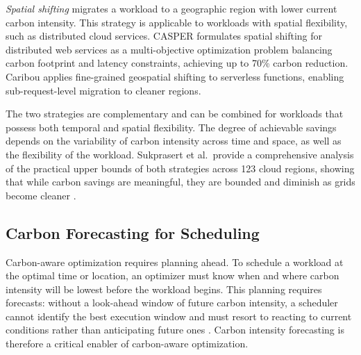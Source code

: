 \textit{Spatial shifting} migrates a workload to a geographic region with lower current carbon intensity.
This strategy is applicable to workloads with spatial flexibility, such as distributed cloud services.
CASPER \cite{souza_casper_2023} formulates spatial shifting for distributed web services as a multi-objective optimization problem balancing carbon footprint and latency constraints, achieving up to 70\% carbon reduction.
Caribou \cite{gsteiger_caribou_2024} applies fine-grained geospatial shifting to serverless functions, enabling sub-request-level migration to cleaner regions.

The two strategies are complementary and can be combined for workloads that possess both temporal and spatial flexibility.
The degree of achievable savings depends on the variability of carbon intensity across time and space, as well as the flexibility of the workload.
Sukprasert et al.\ provide a comprehensive analysis of the practical upper bounds of both strategies across 123 cloud regions, showing that while carbon savings are meaningful, they are bounded and diminish as grids become cleaner \cite{sukprasert_limitations_2024}.

\subsection{Carbon Forecasting for Scheduling}

Carbon-aware optimization requires planning ahead.
To schedule a workload at the optimal time or location, an optimizer must know when and where carbon intensity will be lowest before the workload begins.
This planning requires forecasts: without a look-ahead window of future carbon intensity, a scheduler cannot identify the best execution window and must resort to reacting to current conditions rather than anticipating future ones \cite{grid_observability}.
Carbon intensity forecasting is therefore a critical enabler of carbon-aware optimization.


